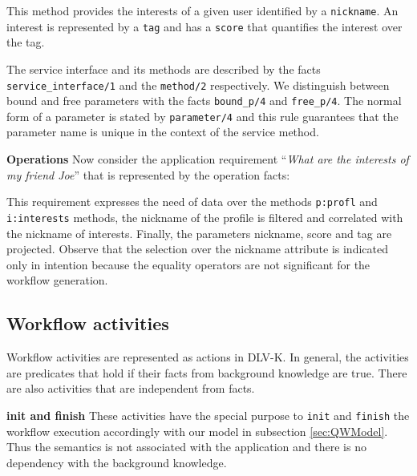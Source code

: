 \documentclass{acm_proc_article-sp}
\begin{document}
This method provides the interests of a given user identified by a \texttt{nickname}. An interest is represented by a \texttt{tag} and has a \texttt{score} that quantifies the interest over the tag.

The service interface and its methods are described by the facts \texttt{service_interface/1} and the \texttt{method/2} respectively. We distinguish between bound and free parameters with the facts \texttt{bound_p/4} and \texttt{free_p/4}. The normal form of a parameter is stated by \texttt{parameter/4} and this rule guarantees that the parameter name is unique in the context of the service method.

%


            
\textbf{Operations} Now consider the application requirement ``\textit{What are the interests of my friend Joe}'' that is represented by the operation facts:

%



This requirement expresses the need of data over the methods \texttt{p:profl} and \texttt{i:interests} methods, the nickname of the profile is filtered and correlated with the nickname of interests. Finally, the parameters nickname, score and tag are projected. Observe that the selection over the nickname attribute is indicated only in intention because the equality operators are not significant for the workflow generation.

\subsection{Workflow activities}
Workflow activities are represented as actions in DLV-K. In general, the activities are predicates that hold if their facts from background knowledge are true. There are also activities that are independent from facts.
         
\textbf{init and finish} These activities have the special purpose to \texttt{init} and \texttt{finish} the workflow execution accordingly with our model in subsection \ref{sec:QWModel}. Thus the semantics is not associated with the application and there is no dependency with the background knowledge.
\end{document}
